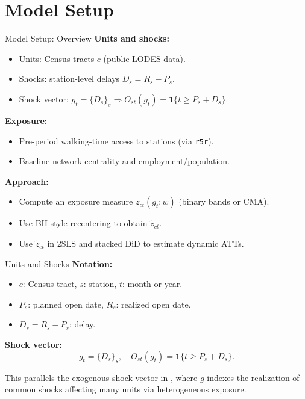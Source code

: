 \documentclass{beamer}
\begin{document}
\section{Model Setup}
\begin{frame}{Model Setup: Overview}
\small
\textbf{Units and shocks:}
\begin{itemize}
    \item Units: Census tracts $c$ (public LODES data).
    \item Shocks: station-level delays $D_s = R_s - P_s$.
    \item Shock vector: $g_t = \{D_s\}_s \Rightarrow O_{st}(g_t) = \mathbf{1}\{t \ge P_s + D_s\}$.
\end{itemize}

\medskip
\textbf{Exposure:}
\begin{itemize}
    \item Pre-period walking-time access to stations (via \texttt{r5r}).
    \item Baseline network centrality and employment/population.
\end{itemize}

\medskip
\textbf{Approach:}
\begin{itemize}
    \item Compute an exposure measure $z_{ct}(g_t; w)$ (binary bands or CMA).
    \item Use BH-style recentering to obtain $\tilde{z}_{ct}$.
    \item Use $\tilde{z}_{ct}$ in 2SLS and stacked DiD to estimate dynamic ATTs.
\end{itemize}
\end{frame}

\begin{frame}{Units and Shocks}
\small
\textbf{Notation:}
\begin{itemize}
    \item $c$: Census tract, $s$: station, $t$: month or year.
    \item $P_s$: planned open date, $R_s$: realized open date.
    \item $D_s = R_s - P_s$: delay.
\end{itemize}

\medskip
\textbf{Shock vector:}
\[
g_t = \{D_s\}_s, \quad O_{st}(g_t) = \mathbf{1}\{t \ge P_s + D_s\}.
\]

\medskip
This parallels the exogenous-shock vector in \textcite{borusyak_nonrandom_2023}, where $g$ indexes the realization of common shocks affecting many units via heterogeneous exposure.
\end{frame}
\end{document}
